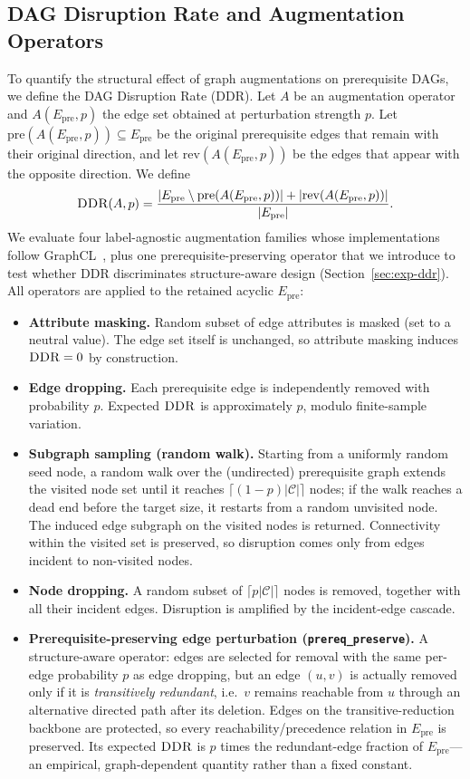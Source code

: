\documentclass[runningheads]{llncs}
\newcommand{\Epre}{\ensuremath{E_{\text{pre}}}}
\newcommand{\DDR}{\textsc{DDR}}
\begin{document}
\subsection{DAG Disruption Rate and Augmentation Operators}
\label{sec:ddr}
To quantify the structural effect of graph augmentations on prerequisite
DAGs, we define the DAG Disruption Rate (\DDR{}). Let $A$ be an
augmentation operator and $A(\Epre,p)$ the edge set obtained at
perturbation strength $p$. Let $\mathrm{pre}(A(\Epre,p))\subseteq\Epre$
be the original prerequisite edges that remain with their original
direction, and let $\mathrm{rev}(A(\Epre,p))$ be the edges that appear
with the opposite direction. We define
\begin{equation}
\DDR(A,p)=
\frac{|\Epre\setminus \mathrm{pre}(A(\Epre,p))|
      +|\mathrm{rev}(A(\Epre,p))|}
     {|\Epre|}.
\label{eq:ddr}
\end{equation}
We evaluate four label-agnostic augmentation families whose
implementations follow GraphCL~\cite{you2020graphcl}, plus one
prerequisite-preserving operator that we introduce to test whether
\DDR{} discriminates structure-aware design (Section~\ref{sec:exp-ddr}).
All operators are applied to the retained acyclic $\Epre$:
\begin{itemize}
  \item \textbf{Attribute masking.} Random subset of edge attributes
  is masked (set to a neutral value). The edge set itself is
  unchanged, so attribute masking induces $\DDR=0$ by construction.
  \item \textbf{Edge dropping.} Each prerequisite edge is independently
  removed with probability $p$. Expected $\DDR$ is approximately $p$,
  modulo finite-sample variation.
  \item \textbf{Subgraph sampling (random walk).} Starting from a
  uniformly random seed node, a random walk over the (undirected)
  prerequisite graph extends the visited node set until it reaches
  $\lceil(1-p)|\mathcal{C}|\rceil$ nodes; if the walk reaches a dead
  end before the target size, it restarts from a random unvisited
  node. The induced edge subgraph on the visited nodes is returned.
  Connectivity within the visited set is preserved, so disruption
  comes only from edges incident to non-visited nodes.
  \item \textbf{Node dropping.} A random subset of $\lceil p|\mathcal{C}|\rceil$
  nodes is removed, together with all their incident edges. Disruption
  is amplified by the incident-edge cascade.
  \item \textbf{Prerequisite-preserving edge perturbation
  (\texttt{prereq\_preserve}).} A structure-aware operator: edges are
  selected for removal with the same per-edge probability $p$ as edge
  dropping, but an edge $(u,v)$ is actually removed only if it is
  \emph{transitively redundant}, i.e.\ $v$ remains reachable from $u$
  through an alternative directed path after its deletion. Edges on the
  transitive-reduction backbone are protected, so every
  reachability/precedence relation in $\Epre$ is preserved. Its expected
  $\DDR$ is $p$ times the redundant-edge fraction of $\Epre$---an
  empirical, graph-dependent quantity rather than a fixed constant.
\end{itemize}
\end{document}
